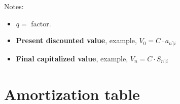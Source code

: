 \documentclass[10pt, a4paper]{article}
\begin{document}
	\vspace*{0.5cm}
	
	Notes:
	\begin{itemize}[leftmargin=*]
		\item[] $q =$ factor.
		\item[] \textbf{Present discounted value}, example, $V_{0} = C \cdot a_{n \rceil i}$
		\item[] \textbf{Final capitalized value}, example, $V_{n} = C \cdot S_{n \rceil i}$
	\end{itemize}
	
	\newpage
	
	\section*{Amortization table}
	
\end{document}

